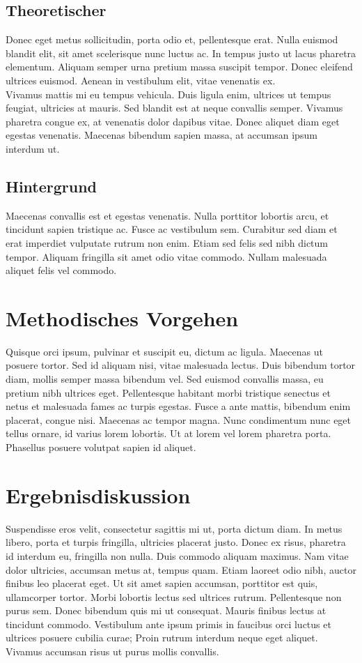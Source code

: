 \documentclass[a4paper, ngerman, oneside, 10pt]{article}
\begin{document}
\subsection{Theoretischer}
Donec eget metus sollicitudin, porta odio et, pellentesque erat. Nulla euismod blandit elit, sit amet scelerisque nunc luctus ac. In tempus justo ut lacus pharetra elementum. Aliquam semper urna pretium massa suscipit tempor. Donec eleifend ultrices euismod. Aenean in vestibulum elit, vitae venenatis ex.\\
Vivamus mattis mi eu tempus vehicula. Duis ligula enim, ultrices ut tempus feugiat, ultricies at mauris. Sed blandit est at neque convallis semper. Vivamus pharetra congue ex, at venenatis dolor dapibus vitae. Donec aliquet diam eget egestas venenatis. Maecenas bibendum sapien massa, at accumsan ipsum interdum ut.

\subsection{Hintergrund}
Maecenas convallis est et egestas venenatis. Nulla porttitor lobortis arcu, et tincidunt sapien tristique ac. Fusce ac vestibulum sem. Curabitur sed diam et erat imperdiet vulputate rutrum non enim. Etiam sed felis sed nibh dictum tempor. Aliquam fringilla sit amet odio vitae commodo. Nullam malesuada aliquet felis vel commodo.

\section{Methodisches Vorgehen}
Quisque orci ipsum, pulvinar et suscipit eu, dictum ac ligula. Maecenas ut posuere tortor. Sed id aliquam nisi, vitae malesuada lectus. Duis bibendum tortor diam, mollis semper massa bibendum vel. Sed euismod convallis massa, eu pretium nibh ultrices eget. Pellentesque habitant morbi tristique senectus et netus et malesuada fames ac turpis egestas. Fusce a ante mattis, bibendum enim placerat, congue nisi. Maecenas ac tempor magna. Nunc condimentum nunc eget tellus ornare, id varius lorem lobortis. Ut at lorem vel lorem pharetra porta. Phasellus posuere volutpat sapien id aliquet.

\section{Ergebnisdiskussion}
Suspendisse eros velit, consectetur sagittis mi ut, porta dictum diam. In metus libero, porta et turpis fringilla, ultricies placerat justo. Donec ex risus, pharetra id interdum eu, fringilla non nulla. Duis commodo aliquam maximus. Nam vitae dolor ultricies, accumsan metus at, tempus quam. Etiam laoreet odio nibh, auctor finibus leo placerat eget. Ut sit amet sapien accumsan, porttitor est quis, ullamcorper tortor. Morbi lobortis lectus sed ultrices rutrum. Pellentesque non purus sem. Donec bibendum quis mi ut consequat. Mauris finibus lectus at tincidunt commodo. Vestibulum ante ipsum primis in faucibus orci luctus et ultrices posuere cubilia curae; Proin rutrum interdum neque eget aliquet. Vivamus accumsan risus ut purus mollis convallis.
\end{document}
